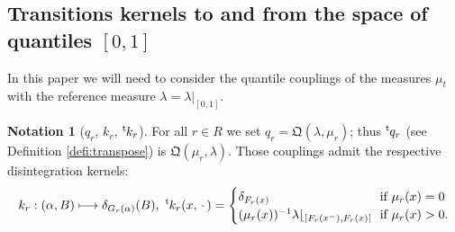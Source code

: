 \documentclass[10pt,a4paper]{article}
\newcommand\mto{\mathchoice{\longmapsto}{\mapsto}{\mapsto}{\mapsto}}
\theoremstyle{plain}
\theoremstyle{definition}
\newtheorem{notation}[them]{Notation} %
\newcommand{\como}{\mathfrak{Q}}
\let\mb\relax
\let\mn\relax
\newcommand{\trans}{{}^{\mathrm{t}}\mkern-1mu}
\newcommand{\espcdot}{\mbox{$\,\cdot\,$}}
\newcommand{\Lg}{\lambda|_{[0,1]}}
\newcommand{\la}{\lambda}
\begin{document}
\subsection{Transitions kernels to and from the space of quantiles \mb$[0,1]$\mn}\label{subsec:little_t}
In this paper we will need to consider the quantile couplings of the measures $\mu_t$ with the reference measure $\la=\Lg$.

\begin{notation}[$q_r$, $k_r$, $\trans k_r$] \label{notation:kernels} For all $r\in R$ we set $q_r= \como(\la,\mu_r)$; thus $\trans q_r$ (see Definition \ref{defi:transpose}) is $\como(\mu_r, \lambda)$. Those couplings admit the respective disintegration kernels:\vspace*{-3pt}
\begin{align*}
k_r:(\alpha,B)\mto \delta_{G_{r}(\alpha)}(B),\ \trans{k}_r(x,\espcdot)=
\begin{cases}
\delta_{F_r(x)}&\!\!\text{if }\mu_r(x)=0\\
(\mu_r(x))^{-1}\la\lfloor_{]F_r(x^-),F_r(x)[}&\!\!\text{if }\mu_r(x)>0.\\
\end{cases}
\end{align*}
\end{notation}
\end{document}
